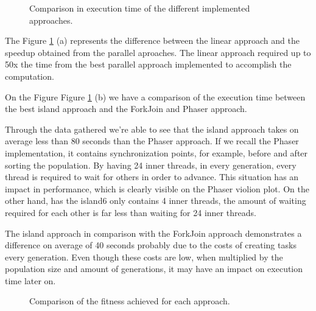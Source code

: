 \documentclass[runningheads]{llncs}
\begin{document}
\begin{figure}[H]
\centering

%
\qquad
{}%
\caption{Comparison in execution time of the different implemented approaches.} \label{comparacaolinear}
\label{comparacaoImpl}%
\end{figure}

The Figure \ref{comparacaoImpl} (a) represents the difference between the linear approach and the speedup obtained from the parallel aproaches. The linear approach required up to 50x the time from the best parallel approach implemented to accomplish the computation.

On the Figure Figure \ref{comparacaoImpl} (b) we have a comparison of the execution time between the best island approach and the ForkJoin and Phaser approach.

Through the data gathered we're able to see that the island approach takes on average less than 80 seconds than the Phaser approach. If we recall the Phaser implementation, it contains synchronization points, for example, before and after sorting the population. By having 24 inner threads, in every generation, every thread is required to wait for others in order to advance. This situation has an impact in performance, which is clearly visible on the Phaser violion plot. On the other hand, has the island6 only contains 4 inner threads, the amount of waiting required for each other is far less than waiting for 24 inner threads.

The island approach in comparison with the ForkJoin approach demonstrates a difference on average of 40 seconds probably due to the costs of creating tasks every generation. Even though these costs are low, when multiplied by the population size and amount of generations, it may have an impact on execution time later on.



\begin{figure}[H]
\centering
{}
\caption{Comparison of the fitness achieved for each approach.} \label{comparacaofitness}
\end{figure}
\end{document}
